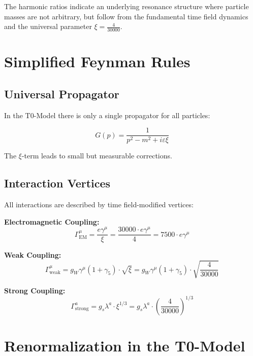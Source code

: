 \documentclass[12pt,a4paper]{report}
\newcommand{\xipar}{\xi}      %
\begin{document}
	The harmonic ratios indicate an underlying resonance structure where particle masses are not arbitrary, but follow from the fundamental time field dynamics and the universal parameter $\xipar = \frac{4}{30000}$.
	\section{Simplified Feynman Rules}\label{sec:simplified_feynman_rules}
	
	\subsection{Universal Propagator}\label{subsec:universal_propagator}
	
	In the T0-Model there is only a single propagator for all particles:
	
	\begin{equation}\label{eq:universal_propagator}
		G(p) = \frac{1}{p^2 - m^2 + i\varepsilon \xipar}
	\end{equation}
	
	The $\xipar$-term leads to small but measurable corrections.
	
	\subsection{Interaction Vertices}\label{subsec:interaction_vertices}
	
	All interactions are described by time field-modified vertices:
	
	\textbf{Electromagnetic Coupling:}
	\begin{equation}
		\Gamma_{\text{EM}}^\mu = \frac{e \gamma^\mu}{\xipar} = \frac{30000 \cdot e \gamma^\mu}{4} = 7500 \cdot e \gamma^\mu
	\end{equation}
	
	\textbf{Weak Coupling:}
	\begin{equation}
		\Gamma_{\text{weak}}^\mu = g_W \gamma^\mu (1 + \gamma_5) \cdot \sqrt{\xipar} = g_W \gamma^\mu (1 + \gamma_5) \cdot \sqrt{\frac{4}{30000}}
	\end{equation}
	
	\textbf{Strong Coupling:}
	\begin{equation}
		\Gamma_{\text{strong}}^a = g_s \lambda^a \cdot \xipar^{1/3} = g_s \lambda^a \cdot \left(\frac{4}{30000}\right)^{1/3}
	\end{equation}
	
	\section{Renormalization in the T0-Model}\label{sec:renormalization}
	
\end{document}
